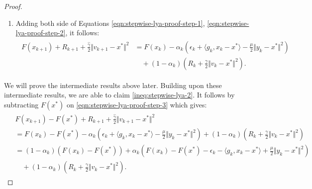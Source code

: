 \documentclass[12pt]{article}
\begin{document}
\begin{proof}
\begin{enumerate}
            \item Adding both side of Equations \eqref{eqn:stepwise-lya-proof-step-1}, \eqref{eqn:stepwise-lya-proof-step-2}, it follows:
            \begin{align}\tag{Step 3}\label{eqn:stepwise-lya-proof-step-3}
                \begin{split}
                    F(x_{k + 1}) + R_{k + 1} +
                    \frac{\hat \gamma}{2}\Vert v_{k + 1} - x^*\Vert^2
                    &=
                    F(x_k) - \alpha_k\left(
                        \epsilon_k + \langle g_k, x_k - x^*\rangle
                        - \frac{\mu}{2}\Vert y_k - x^*\Vert^2
                    \right)
                    \\
                    & \quad
                    +
                    (1 - \alpha_k)\left(
                        R_k + \frac{\gamma}{2}\Vert v_k - x^*\Vert^2
                    \right).
                \end{split}
            \end{align}
        \end{enumerate}
        We will prove the intermediate results above later.
        Building upon these intermediate results, we are able to claim \eqref{ineq:stepwise-lya-2}.
        It follows by subtracting $F(x^*)$ on \eqref{eqn:stepwise-lya-proof-step-3} which gives:
        \begin{align}
            \begin{split}\label{eqn:stepwise-lya-proof-eqn3.2}
                & F(x_{k + 1}) - F(x^*) + R_{k + 1} +
                \frac{\hat \gamma}{2}\Vert v_{k + 1} - x^*\Vert^2
                \\
                &=
                F(x_k) - F(x^*) - \alpha_k\left(
                    \epsilon_k + \langle g_k, x_k - x^*\rangle
                    - \frac{\mu}{2}\Vert y_k - x^*\Vert^2
                \right)
                +
                (1 - \alpha_k)\left(
                    R_k + \frac{\gamma}{2}\Vert v_k - x^*\Vert^2
                \right)
                \\
                &= (1 - \alpha_k)(F(x_k) - F(x^*))
                + \alpha_k\left(
                    F(x_k) - F(x^*) - \epsilon_k - \langle g_k, x_k - x^*\rangle + \frac{\mu}{2}\Vert y_k - x^*\Vert^2
                \right)
                \\ &\quad
                    +
                    (1 - \alpha_k)\left(
                        R_k + \frac{\gamma}{2}\Vert v_k - x^*\Vert^2
                    \right).

\end{split}
\end{align}
\end{proof}
\end{document}
